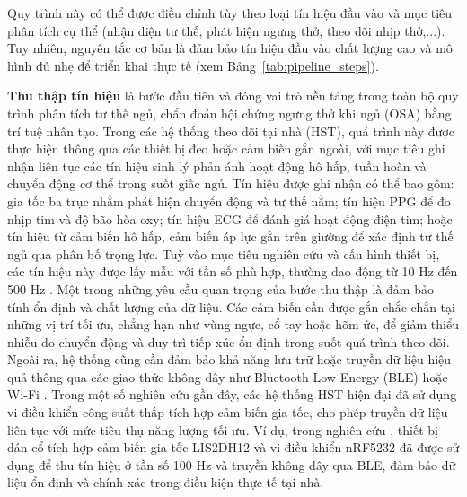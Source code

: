 Quy trình này có thể được điều chỉnh tùy theo loại tín hiệu đầu vào và 
mục tiêu phân tích cụ thể (nhận diện tư thế, phát hiện ngưng thở, 
theo dõi nhịp thở,...). Tuy nhiên, nguyên tắc cơ bản là đảm bảo tín 
hiệu đầu vào chất lượng cao và mô hình đủ nhẹ để triển khai thực tế (xem Bảng~\ref{tab:pipeline_steps}).



\textbf{Thu thập tín hiệu} là bước đầu tiên và đóng vai trò nền tảng 
trong toàn bộ quy trình phân tích tư thế ngủ, chẩn đoán hội chứng ngưng 
thở khi ngủ (OSA) bằng trí tuệ nhân tạo. Trong các hệ thống theo dõi tại 
nhà (HST), quá trình này được thực hiện thông qua các thiết bị đeo hoặc 
cảm biến gắn ngoài, với mục tiêu ghi nhận liên tục các tín hiệu sinh 
lý phản ánh hoạt động hô hấp, tuần hoàn và chuyển động cơ thể trong 
suốt giấc ngủ.
Tín hiệu được ghi nhận có thể bao gồm: gia tốc ba trục nhằm phát hiện 
chuyển động và tư thế nằm; tín hiệu PPG để đo nhịp tim và độ bão hòa oxy; 
tín hiệu ECG để đánh giá hoạt động điện tim; hoặc tín hiệu từ cảm biến hô 
hấp, cảm biến áp lực gắn trên giường để xác định tư thế ngủ qua phân 
bố trọng lực. Tuỳ vào mục tiêu nghiên cứu và cấu hình thiết bị, các tín 
hiệu này được lấy mẫu với tần số phù hợp, thường dao động từ 10 Hz đến 
500 Hz \cite{Sleep_Posture_Detection, Jeng_osa, Zhang_osa, Ferrer_osa, Sang, osa_sanchez2025}.
Một trong những yêu cầu quan trọng của bước thu thập là đảm bảo tính 
ổn định và chất lượng của dữ liệu. Các cảm biến cần được gắn chắc chắn 
tại những vị trí tối ưu, chẳng hạn như vùng ngực, cổ tay hoặc hõm ức, 
để giảm thiểu nhiễu do chuyển động và duy trì tiếp xúc ổn định trong 
suốt quá trình theo dõi. Ngoài ra, hệ thống cũng cần đảm bảo khả năng 
lưu trữ hoặc truyền dữ liệu hiệu quả thông qua các giao thức không dây 
như Bluetooth Low Energy (BLE) hoặc Wi-Fi \cite{thuong_wear_paper, hst_wear_paper}.
Trong một số nghiên cứu gần đây, các hệ thống HST hiện đại đã sử dụng 
vi điều khiển công suất thấp tích hợp cảm biến gia tốc, cho phép truyền 
dữ liệu liên tục với mức tiêu thụ năng lượng tối ưu. Ví dụ, trong nghiên 
cứu \cite{Sleep_Posture_Detection}, thiết bị dán cổ tích hợp cảm biến gia 
tốc LIS2DH12 và vi điều khiển nRF5232 đã được sử dụng để thu tín hiệu ở 
tần số 100 Hz và truyền không dây qua BLE, đảm bảo dữ liệu ổn định và 
chính xác trong điều kiện thực tế tại nhà.

